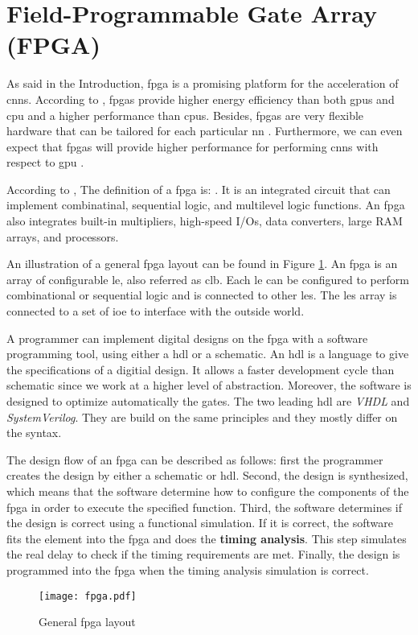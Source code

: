 \section{Field-Programmable Gate Array (FPGA)} \label{sec:fpga}
%
%
As said in the Introduction, \acrshort{fpga} is a promising platform for the acceleration of \acrshort{cnn}s. According to \textcite{mittal_survey_2015}, \acrshort{fpga}s provide higher energy efficiency than both \acrshort{gpu}s and \acrshort{cpu} and a higher performance than \acrshort{cpu}s. Besides, \acrshort{fpga}s are very flexible hardware that can be tailored for each particular \acrshort{nn} \cite{vestias_fast_2019}. Furthermore, we can even expect that \acrshort{fpga}s will provide higher performance for performing \acrshort{cnn}s with respect to \acrshort{gpu} \cite{nurvitadhi_can_2017}.

According to \textcite{harris_digital_2015}, The definition of a \acrshort{fpga} is: . It is an integrated circuit that can implement combinatinal, sequential logic, and multilevel logic functions. An \acrshort{fpga} also integrates built-in multipliers, high-speed I/Os, data converters, large RAM arrays, and processors.

An illustration of a general \acrshort{fpga} layout can be found in Figure \ref{fig:fpga}. An \acrshort{fpga} is an array of configurable \acrfull{le}, also referred as \acrfull{clb}. Each \acrshort{le} can be configured to perform combinational or sequential logic and is connected to other \acrshort{le}s. The \acrshort{le}s array is connected to a set of \acrfull{ioe} to interface with the outside world.

A programmer can implement digital designs on the \acrshort{fpga} with a software programming tool, using either a \acrfull{hdl} or a schematic. An \acrshort{hdl} is a language to give the specifications of a digitial design. It allows a faster development cycle than schematic since we work at a higher level of abstraction. Moreover, the software is designed to optimize automatically the gates. The two leading \acrshort{hdl} are \textit{VHDL} and \textit{SystemVerilog}. They are build on the same principles and they mostly differ on the syntax.

%
The design flow of an \acrshort{fpga} can be described as follows: first the programmer creates the design by either a schematic or \acrshort{hdl}. Second, the design is synthesized, which means that the software determine how to configure the components of the \acrshort{fpga} in order to execute the specified function. Third, the software determines if the design is correct using a functional simulation. If it is correct, the software fits the element into the \acrshort{fpga} and does the \textbf{timing analysis}. This step simulates the real delay to check if the timing requirements are met. Finally, the design is programmed into the \acrshort{fpga} when the timing analysis simulation is correct.
%
\begin{figure}[H]
    \centering
    \texttt{[image: fpga.pdf]}
    \caption{General \acrshort{fpga} layout \cite{harris_digital_2015}}
    \label{fig:fpga}
\end{figure}
